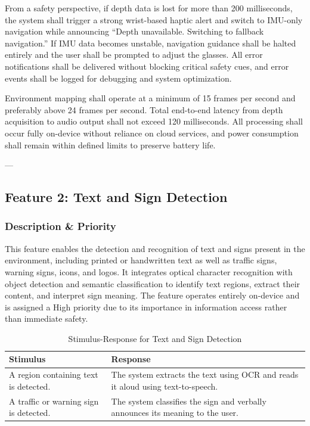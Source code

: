 From a safety perspective, if depth data is lost for more than 200 milliseconds, the system shall trigger a strong wrist-based haptic alert and switch to IMU-only navigation while announcing “Depth unavailable. Switching to fallback navigation.” If IMU data becomes unstable, navigation guidance shall be halted entirely and the user shall be prompted to adjust the glasses. All error notifications shall be delivered without blocking critical safety cues, and error events shall be logged for debugging and system optimization.

Environment mapping shall operate at a minimum of 15 frames per second and preferably above 24 frames per second. Total end-to-end latency from depth acquisition to audio output shall not exceed 120 milliseconds. All processing shall occur fully on-device without reliance on cloud services, and power consumption shall remain within defined limits to preserve battery life.

---

\subsection{Feature 2: Text and Sign Detection}

\subsubsection{Description \& Priority}

This feature enables the detection and recognition of text and signs present in the environment, including printed or handwritten text as well as traffic signs, warning signs, icons, and logos. It integrates optical character recognition with object detection and semantic classification to identify text regions, extract their content, and interpret sign meaning. The feature operates entirely on-device and is assigned a High priority due to its importance in information access rather than immediate safety.

\begin{table}[H]
    \centering
    \begin{tabular}{|p{}|p{}|}
        \hline
        \textbf{Stimulus} & \textbf{Response} \\
        \hline
        A region containing text is detected. &
        The system extracts the text using OCR and reads it aloud using text-to-speech. \\
        \hline
        A traffic or warning sign is detected. &
        The system classifies the sign and verbally announces its meaning to the user. \\
        \hline
    \end{tabular}
    \caption{Stimulus-Response for Text and Sign Detection}
\end{table}

